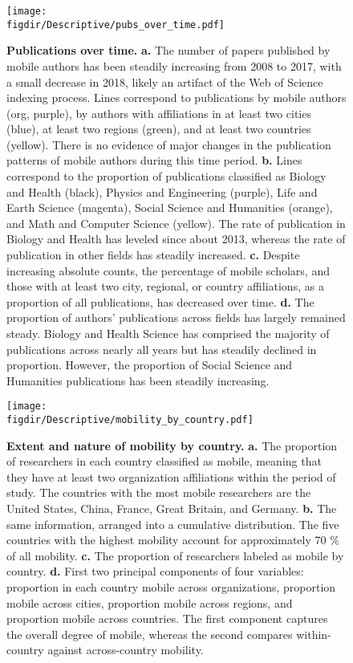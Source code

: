 \documentclass[12pt]{article} %
\def\figdir{../Figs}
\begin{document}
%
%
\begin{figure}[p!]
	\centering
	\texttt{[image: \\figdir/Descriptive/pubs\_over\_time.pdf]}
	\caption{
		\textbf{Publications over time.}
		\textbf{a.}
		The number of papers published by mobile authors has been steadily increasing from 2008 to 2017, with a small decrease in 2018,  likely an artifact of the Web of Science indexing process.
		Lines correspond to publications by mobile authors (org, purple), by authors with affiliations in at least two cities (blue), at least two regions (green), and at least two countries (yellow).
		There is no evidence of major changes in the publication patterns of mobile authors during this time period.
		\textbf{b.}
		Lines correspond to the proportion of publications classified as Biology and Health (black), Physics and Engineering (purple), Life and Earth Science (magenta), Social Science and Humanities (orange), and Math and Computer Science (yellow).
		The rate of publication in Biology and Health has leveled since about 2013, whereas the rate of publication in other fields has steadily increased.
		\textbf{c.}
		Despite increasing absolute counts, the percentage of mobile scholars, and those with at least two city, regional, or country affiliations, as a proportion of all publications, has decreased over time.
		\textbf{d.}
		The proportion of authors' publications across fields has largely remained steady.
		Biology and Health Science has comprised the majority of publications across nearly all years but has steadily declined in proportion.
		However, the proportion of Social Science and Humanities publications has been steadily increasing.
	}
	\label{fig:supp:pubs_over_time}
\end{figure}



%
%
\begin{figure}[p!]
	\centering
	\texttt{[image: \\figdir/Descriptive/mobility\_by\_country.pdf]}
	\caption{
		\textbf{Extent and nature of mobility by country.}
		\textbf{a.}
		The proportion of researchers in each country classified as mobile, meaning that they have at least two organization affiliations within the period of study.
		The countries with the most mobile researchers are the United States, China, France, Great Britain, and Germany.
		\textbf{b.}
		The same information, arranged into a cumulative distribution.
		The five countries with the highest mobility account for approximately 70 \% of all mobility.
		\textbf{c.} The proportion of researchers labeled as mobile by country.
		\textbf{d.} First two principal components of four variables: proportion in each country mobile across organizations, proportion mobile across cities, proportion mobile across regions, and proportion mobile across countries.
		The first component captures the overall degree of mobile, whereas the second compares within-country against across-country mobility.
	}
	\label{fig:supp:descriptives}
\end{figure}
\end{document}
